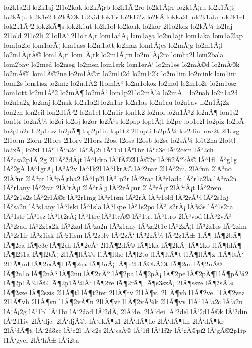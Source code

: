 {lo2k1a2d
lo2k1aj
2l1o2kak
lo2kÃ¡rb
lo2k1Ã¡2ro
lo2k1Ã¡rr
lo2k1Ã¡ru
lo2k1Ã¡tj
lo2kÃ¡u
lo2k1e2
lo2kÃ©k
lo2kid
lok1is
lo2k1i2z
lo2kÃ­
lokka2l
lok2k1ala
lok2k1el
lok2k1Ã³2
lok2kÃ¶s
lok2k1ut
lo2k1ol
lo2konk
lo2kor
2l1o2koz
lo2kÃ¼
lo2laj
2l1old
2l1o2li
2l1ollÃ³
2l1oltÃ¡r
lom1adÃ¡
lom1aga
lo2m1ajt
lom1aka
lom1a2lap
lom1a2lo
lom1arÃ¡
lom1ass
lo2m1att
lo2maz
lom1Ã¡cs
lo2mÃ¡g
lo2m1Ã¡l
lo2m1Ã¡rÃ©
lom1Ã¡ri
lom1Ã¡rk
lo2m1Ã¡rn
lo2m1Ã¡2ro
lomba2l
lom2bala
lom2bav
lo2med
lo2meg
lo2men
lom1erk
lom1erÅ‘
lo2m1es
lo2mÃ©d
lo2mÃ©k
lo2mÃ©l
lom1Ã©2ne
lo2m1Ã©ri
lo2m1i2d
lo2m1i2k
lo2m1im
lo2mink
lom1int
lomi2s
lom1isz
lo2miz
lo2m1Ã­2
l1omlÃ³
lo2m1okoz
lo2mol
lo2m1o2r
lo2m1osz
lom1ott
lo2m1Ã³2
lo2mÃ¶
lo2mÅ‘
lom1p2l
lo2mÃ¼
lo2mÅ±
lo2nab
lo2n1a2d
lo2n1a2g
lo2naj
lo2nak
lo2n1a2l
lo2n1ar
lo2n1as
lo2n1au
lo2n1av
lo2n1Ã¡2z
lon2ch
lon2cil
lon2d1Ã³2
lo2n1el
lo2n1ir
lon1k2
lo2nol
lo2n1Ã³2
lo2nÃ¶
lon1s2
lon1tr
lo2nÃ¼
lo2oi
lo2oj
lo2or
lo2Ã³s
lo2pap
lop1Ã¡l
lo2pe
lop1e2l
lo2piz
lo2pÃ­
lo2p1o2r
lo2p1osz
lo2pÃ¶
lop2p1in
lop1t2
2l1opti
lo2pÃ¼
lor2din
lore2t
2l1org
2l1orm
2lorn
2l1ors
2l1orv
2l1orz
l2os.
l2osa
l2osb
lo2se
lo2sÃ¼
lo1t2ha
2lottl
lo2xÃ¡
lo2xi
1lÃ³
lÃ³a2d
lÃ³Ã¡2r
lÃ³1bl
lÃ³1br
lÃ³c3c
lÃ³2cem
lÃ³2ch
lÃ³csa2p1Ã¡2g
2l1Ã³2dÃ¡t
lÃ³1dro
lÃ³fÃ©2l1Ã©2v
lÃ³fi2ÃºkÃ©
lÃ³1fl
lÃ³g1g
lÃ³2gÃ­
lÃ³1grÃ¡
lÃ³Ã­2v
lÃ³1k2l
lÃ³1krÃ©
lÃ³2nar
2l1Ã³2ni.
2lÃ³nn
2lÃ³no
2lÃ³nr
2lÃ³nt
lÃ³pÃ¡rba2
lÃ³1p2l
lÃ³1p2r
lÃ³2rac
lÃ³r1ada
lÃ³r1a2la
lÃ³ra2n
lÃ³r1any
lÃ³2rar
2lÃ³rÃ¡i
2lÃ³rÃ¡j
lÃ³2rÃ¡mr
2lÃ³rÃ¡r
2lÃ³rÃ¡t
lÃ³2rem
lÃ³2r1e2s
lÃ³2r1Ã©r
lÃ³2r1ing
lÃ³r1ism
lÃ³2rÃ­
lÃ³r1old
lÃ³2rÃ¼
lÃ³2s1aj
lÃ³sa2n
lÃ³s1any
lÃ³1ski
lÃ³1sla
lÃ³1spe
lÃ³1s2po
lÃ³1s2rÃ¡
lÃ³s3s
lÃ³1s2ta
lÃ³1str
lÃ³1sz
lÃ³1t2rÃ¡
lÃ³1tre
lÃ³1trÃ©
lÃ³1tri
lÃ³1tro
2lÃ³vod
l1Ã³2vÃ³
lÃ³2zad
lÃ³2z1a2k
lÃ³2zal
lÃ³za2n
lÃ³z1any
lÃ³za2t1e
lÃ³2zÃ¡l
lÃ³2z1es
lÃ³2zim
lÃ³2z1ir
lÃ³z1isk
lÃ³z1ism
lÃ³2zolv
lÃ³2zÅ‘
lÃ³2zÃ¼
lÃ³2z1Å±
1lÃ¶
lÃ¶2bÃ¶
lÃ¶2ca
lÃ¶c3c
lÃ¶2ch
lÃ¶2cÅ‘
2l1Ã¶2dÃ©
lÃ¶2ka
lÃ¶2kÃ¡
lÃ¶2ko
l1Ã¶ldÃ¶
lÃ¶l2t1a
lÃ¶l2tÃ¡
2l1Ã¶ltÃ©s
l1Ã¶lthe
lÃ¶l2to
l1Ã¶ltÃ¶t
l1Ã¶ltÃ¶z
l1Ã¶ltÅ‘
2l1Ã¶ml
lÃ¶2mÃ¶l
lÃ¶2na
lÃ¶2nÃ¡
lÃ¶n2b1Ã©kÃ©t
lÃ¶2ne
lÃ¶2nÃ©
lÃ¶2n1o
lÃ¶2nÃ³
lÃ¶2nu
lÃ¶2nÃº
lÃ¶2pa
lÃ¶2pÃ¡
lÃ¶2pe
lÃ¶2pÃ¶l
lÃ¶pÃ¼2
lÃ¶2p1Ã¼lÃ©
lÃ¶2p1Ã¼lÅ‘
lÃ¶2re
lÃ¶2rÃ¶
lÃ¶s3szÃ¡
2lÃ¶ssze
lÃ¶2sÃ¼
lÃ¶2sze
lÃ¶2szis
2l1Ã¶tl
lÃ¶t2ter
2l1Ã¶tv
2l1Ã¶v.
2l1Ã¶vb
l1Ã¶2ve.
l1Ã¶2vez
2l1Ã¶vh
2l1Ã¶vn
l1Ã¶2vÃ¶n
2l1Ã¶vr
l1Ã¶2vÃ¼k
2l1Ã¶vv
1lÅ‘
lÅ‘a2c
lÅ‘a2n
lÅ‘Ã¡2g
lÅ‘1bl
lÅ‘1br
lÅ‘2dad
lÅ‘2dÃ¡
2lÅ‘de.
2lÅ‘dei
lÅ‘2del
lÅ‘2d1Ã©k
lÅ‘2din
lÅ‘2d1iv
2lÅ‘dje.
2lÅ‘djÃ©t
lÅ‘dkÃ¶z1
2lÅ‘dÃ¶ke
2lÅ‘dÃ¶kn
2lÅ‘dÃ¶kr
2lÅ‘dÃ¶t.
lÅ‘2d3ze
lÅ‘e2l
lÅ‘e2s
2lÅ‘esÃ©
lÅ‘1fl
lÅ‘1f2r
lÅ‘gÃ©pi2
lÅ‘gÃ©2p1ip
l1Å‘gyel
2lÅ‘hÅ±
lÅ‘i2ta
}
